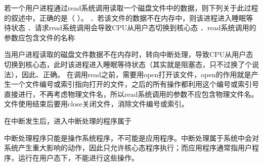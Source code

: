 \question 若一个用户进程通过read系统调用读取一个磁盘文件中的数据，则下列关于此过程的叙述中，正确的是（
）。 ．若该文件的数据不在内存中，则该进程进入睡眠等待状态
．请求read系统调用会导致CPU从用户态切换到核心态
．read系统调用的参数应包含文件的名称
\par{}
\begin{solution}当用户进程读取的磁盘文件数据不在内存时，转向中断处理，导致CPU从用户态切换到核心态，此时该进程进入睡眠等待状态（其实就是阻塞态，只不过换了个说法），因此、正确。
在调用read之前，需要用open打开该文件，open的作用就是产生一个文件编号或索引指向打开的文件，之后的所有操作都利用这个编号或索引号直接进行，不再考虑物理文件名，所以read系统调用的参数不应包含物理文件名。文件使用结束后要用close关闭文件，消除文件编号或索引。
\end{solution}
\question 在中断发生后，进入中断处理的程序属于
\par{}
\begin{solution}中断处理程序只能是操作系统程序，不可能是应用程序。中断处理属于系统中会对系统产生重大影响的动作，因此只允许核心态程序执行；而应用程序通常指用户程序，运行在用户态下，不能进行这些操作。
\end{solution}
